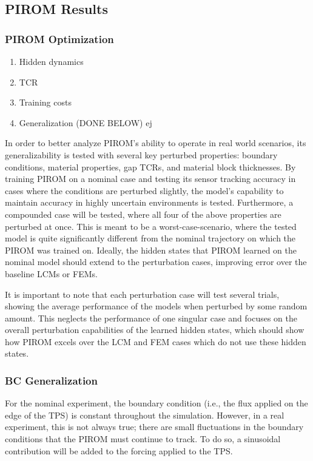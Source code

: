 \subsection{PIROM Results}
\subsubsection{PIROM Optimization}
\begin{enumerate}
    \item Hidden dynamics
    \item TCR
    \item Training costs
    \item Generalization (DONE BELOW)
ej\end{enumerate}

In order to better analyze PIROM's ability to operate in real world scenarios, its generalizability is tested with several key perturbed properties: boundary conditions, material properties, gap TCRs, and material block thicknesses. By training PIROM on a nominal case and testing its sensor tracking accuracy in cases where the conditions are perturbed slightly, the model's capability to maintain accuracy in highly uncertain environments is tested. Furthermore, a compounded case will be tested, where all four of the above properties are perturbed at once. This is meant to be a worst-case-scenario, where the tested model is quite significantly different from the nominal trajectory on which the PIROM was trained on. Ideally, the hidden states that PIROM learned on the nominal model should extend to the perturbation cases, improving error over the baseline LCMs or FEMs.

It is important to note that each perturbation case will test several trials, showing the average performance of the models when perturbed by some random amount. This neglects the performance of one singular case and focuses on the overall perturbation capabilities of the learned hidden states, which should show how PIROM excels over the LCM and FEM cases which do not use these hidden states. 

\subsubsection{BC Generalization}

For the nominal experiment, the boundary condition (i.e., the flux applied on the edge of the TPS) is constant throughout the simulation. However, in a real experiment, this is not always true; there are small fluctuations in the boundary conditions that the PIROM must continue to track. To do so, a sinusoidal contribution will be added to the forcing applied to the TPS. 

